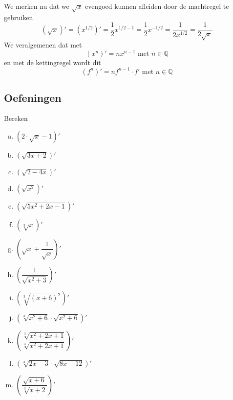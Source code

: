 \documentclass[12pt]{article}
\begin{document}
We merken nu dat we $\sqrt{x}$ evengoed kunnen afleiden door de machtregel te gebruiken
$$
  \left(\sqrt{x}\right)' = \left(x^{1/2}\right)'
                         = \frac{1}{2}x^{1/2-1}
                         = \frac{1}{2}x^{-1/2}
                         = \frac{1}{2x^{1/2}}
                         = \frac{1}{2\sqrt{x}}
$$
We veralgemenen dat met
$$\left(x^n\right)'=nx^{n-1} \mbox{ met } n\in\mathbb{Q}$$
en met de kettingregel wordt dit
$$\left(f^n\right)'=nf^{n-1}\cdot f' \mbox{ met } n\in\mathbb{Q}$$

\subsection{Oefeningen}

\begin{oefening}
Bereken
\begin{multicols}{2}
\begin{enumerate}[(a)]
  \itemsep0.5em
  \item $\displaystyle\left(2\cdot\sqrt{x}-1\right)'$
  \item $\displaystyle\left(\sqrt{3x+2}\right)'$
  \item $\displaystyle\left(\sqrt{2-4x}\right)'$
  \item $\displaystyle\left(\sqrt{x^2}\right)'$
  \item $\displaystyle\left(\sqrt{5x^2+2x-1}\right)'$
  \item $\displaystyle\left(\sqrt[3]{x}\right)'$
  \item $\displaystyle\left(\sqrt{x}+\dfrac{1}{\sqrt{x}}\right)'$
  \item $\displaystyle\left(\dfrac{1}{\sqrt{x^2+3}}\right)'$
  \item $\displaystyle\left(\sqrt[3]{\left(x+6\right)^2}\right)'$
  \item $\displaystyle\left(\sqrt[3]{x^2+6}\cdot\sqrt{x^2+6}\right)'$
  \item $\displaystyle\left(\dfrac{\sqrt[3]{x^2+2x+1}}{\sqrt[4]{x^2+2x+1}}\right)'$
  \item $\displaystyle\left(\sqrt[3]{2x-3}\cdot\sqrt{8x-12}\right)'$
  \item $\displaystyle\left(\dfrac{\sqrt{x+6}}{\sqrt[3]{x+2}}\right)'$
\end{enumerate}
\end{multicols}
\end{oefening}
\end{document}
